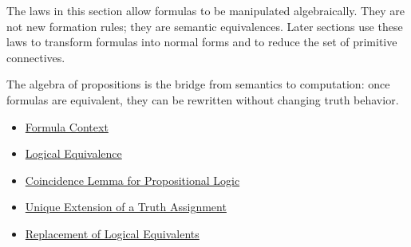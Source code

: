\begin{remark*}[Exposition]
The laws in this section allow formulas to be manipulated algebraically. They are not new formation rules; they are semantic equivalences. Later sections use these laws to transform formulas into normal forms and to reduce the set of primitive connectives.
\end{remark*}

\begin{remark*}[Exposition]
The algebra of propositions is the bridge from semantics to computation: once formulas are equivalent, they can be rewritten without changing truth behavior.
\end{remark*}

\begin{dependencies}
\begin{itemize}
  \item \hyperref[def:formula-context-propositional-logic]{Formula Context}
  \item \hyperref[def:logical-equivalence-propositional-logic]{Logical Equivalence}
  \item \hyperref[lem:coincidence-lemma-propositional-logic]{Coincidence Lemma for Propositional Logic}
  \item \hyperref[thm:unique-extension-truth-assignment-propositional-logic]{Unique Extension of a Truth Assignment}
  \item \hyperref[thm:replacement-of-logical-equivalents-propositional-logic]{Replacement of Logical Equivalents}
\end{itemize}
\end{dependencies}
